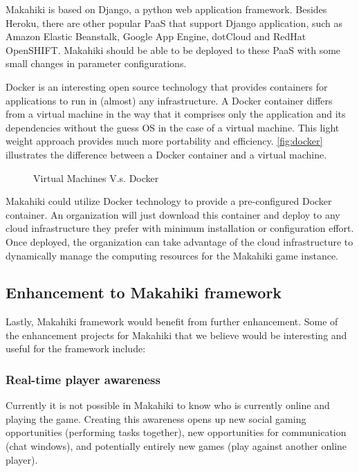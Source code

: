 Makahiki is based on Django, a python web application framework. Besides Heroku, there are other popular PaaS that support Django application, such as Amazon Elastic Beanstalk, Google App Engine, dotCloud and RedHat OpenSHIFT. Makahiki should be able to be deployed to these PaaS with some small changes in parameter configurations. 

Docker \cite{docker} is an interesting open source technology that provides containers for applications to run in (almost) any infrastructure. A Docker container differs from a virtual machine in the way that it comprises only the application and its dependencies without the guess OS in the case of a virtual machine. This light weight approach provides much more portability and efficiency. \autoref{fig:docker} illustrates the difference between a Docker container and a virtual machine.

\begin{figure}[ht!]
	\centering
		\caption{Virtual Machines V.s. Docker \cite {docker}}
		\label{fig:docker}
\end{figure}

Makahiki could utilize Docker technology to provide a pre-configured Docker container. An organization will just download this container and deploy to any cloud infrastructure they prefer with minimum installation or configuration effort. Once deployed, the organization can take advantage of the cloud infrastructure to dynamically manage the computing resources for the Makahiki game instance.

\subsection{Enhancement to Makahiki framework}
Lastly, Makahiki framework would benefit from further enhancement. Some of the enhancement projects for Makahiki that we believe would be interesting and useful for the framework include:

\subsubsection{Real-time player awareness}
Currently it is not possible in Makahiki to know who is currently online and playing the game. Creating this awareness opens up new social gaming opportunities (performing tasks together), new opportunities for communication (chat windows), and potentially entirely new games (play against another online player). 

